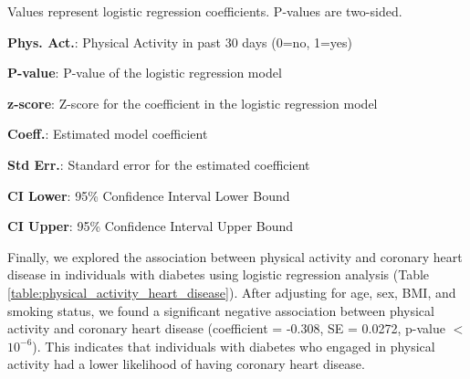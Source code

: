 \documentclass[11pt]{article}
\begin{document}
\begin{table}[h]
\caption{Association between Physical Activity and High Chol. in Individuals with Diabetes}
\label{table:physical_activity_high_cholesterol}
\begin{threeparttable}
\renewcommand{\TPTminimum}{\linewidth}
\begin{tablenotes}
\footnotesize
\item Values represent logistic regression coefficients. P-values are two-sided.
\item \textbf{Phys. Act.}: Physical Activity in past 30 days (0=no, 1=yes)
\item \textbf{P-value}: P-value of the logistic regression model
\item \textbf{z-score}: Z-score for the coefficient in the logistic regression model
\item \textbf{Coeff.}: Estimated model coefficient
\item \textbf{Std Err.}: Standard error for the estimated coefficient
\item \textbf{CI Lower}: 95\% Confidence Interval Lower Bound
\item \textbf{CI Upper}: 95\% Confidence Interval Upper Bound
\end{tablenotes}
\end{threeparttable}
\end{table}


Finally, we explored the association between physical activity and coronary heart disease in individuals with diabetes using logistic regression analysis (Table {}\ref{table:physical_activity_heart_disease}). After adjusting for age, sex, BMI, and smoking status, we found a significant negative association between physical activity and coronary heart disease (coefficient = -0.308, SE = 0.0272, p-value $<$ $10^{-6}$). This indicates that individuals with diabetes who engaged in physical activity had a lower likelihood of having coronary heart disease.
\end{document}
